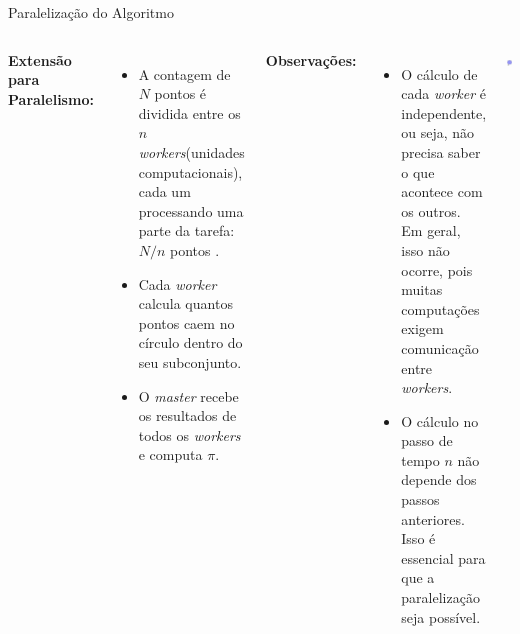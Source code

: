 \documentclass{beamer}
\begin{document}
	\begin{frame}{Paralelização do Algoritmo}
		
		\begin{columns}[T]
			\footnotesize
			\textbf{Extensão para Paralelismo:}
			\begin{itemize}
				\item A contagem de $N$  pontos  é dividida entre os $n$ \textit{workers}(unidades computacionais), cada um processando uma parte da tarefa: $N/n$ pontos .
				\item Cada \textit{worker} calcula quantos pontos caem no círculo dentro do seu subconjunto.
				\item O \textit{master} recebe os resultados de todos os \textit{workers} e computa \(\pi\).
			\end{itemize}
			
			\textbf{Observações:}
			\begin{itemize}
				\item O cálculo de cada \textit{worker} é independente, ou seja, não precisa saber o que acontece com os outros. Em geral, isso não ocorre, pois muitas computações exigem comunicação entre \textit{workers}.
				\item O cálculo no passo de tempo \(n\) não depende dos passos anteriores. Isso é essencial para que a paralelização seja possível.
			\end{itemize}
			
			\includegraphics[scale=0.4]{par_circfig.png}
		\end{columns}
	\end{frame}
	
\end{document}
